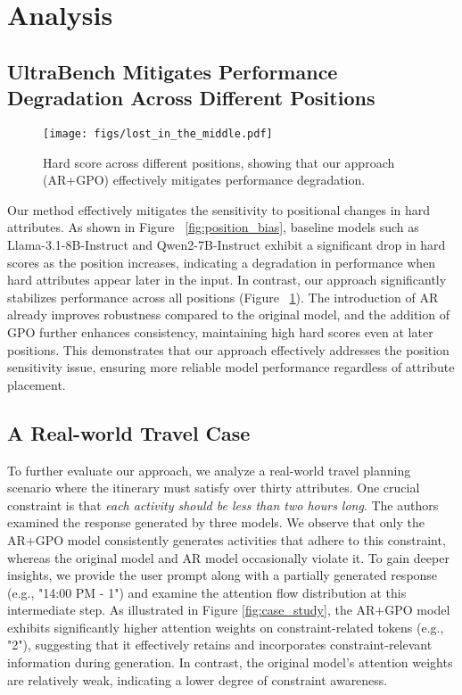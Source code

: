 \section{Analysis}

\subsection{UltraBench Mitigates Performance Degradation Across Different Positions}
\begin{figure}[htbp]
    \centering
        \texttt{[image: figs/lost\_in\_the\_middle.pdf]}
    \caption{Hard score across different positions, showing that our approach (AR+GPO) effectively mitigates performance degradation.}
    \vspace{-1em}
    \label{fig:lost_in_the_middle}
\end{figure}
Our method effectively mitigates the sensitivity to positional changes in hard attributes. As shown in Figure ~\ref{fig:position_bias}, baseline models such as Llama-3.1-8B-Instruct and Qwen2-7B-Instruct exhibit a significant drop in hard scores as the position increases, indicating a degradation in performance when hard attributes appear later in the input. In contrast, our approach significantly stabilizes performance across all positions (Figure ~\ref{fig:lost_in_the_middle}). The introduction of AR already improves robustness compared to the original model, and the addition of GPO further enhances consistency, maintaining high hard scores even at later positions. This demonstrates that our approach effectively addresses the position sensitivity issue, ensuring more reliable model performance regardless of attribute placement.
\subsection{A Real-world Travel Case}
\label{sec:case_study}
To further evaluate our approach, we analyze a real-world travel planning scenario where the itinerary must satisfy over thirty attributes. One crucial constraint is that \textit{each activity should be less than two hours long}. The authors examined the response generated by three models. We observe that only the AR+GPO model consistently generates activities that adhere to this constraint, whereas the original model and AR model occasionally violate it. To gain deeper insights, we provide the user prompt along with a partially generated response (e.g., "14:00 PM - 1") and examine the attention flow distribution at this intermediate step. As illustrated in Figure \ref{fig:case_study}, the AR+GPO model exhibits significantly higher attention weights on constraint-related tokens (e.g., "2"), suggesting that it effectively retains and incorporates constraint-relevant information during generation. In contrast, the original model's attention weights are relatively weak, indicating a lower degree of constraint awareness.

